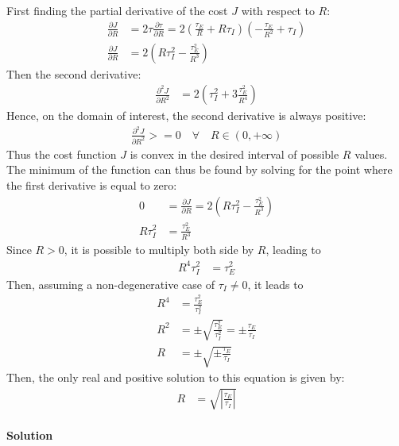 First finding the partial derivative of the cost $J$ with respect to $R$:
%
\begin{align}
\frac{ \partial J }{ \partial R  } &=  2 \tau \frac{ \partial \tau }{ \partial R } = 2 \left( \frac{\tau_E}{R} + R \tau_I \right) \left( -\frac{\tau_E}{R^2} + \tau_I \right) \\
\frac{ \partial J }{ \partial R  } &= 2 \left( R \tau_I^2 - \frac{\tau_E^2}{R^3} \right)
\end{align}
%
Then the second derivative:
%
\begin{align}
\frac{ \partial^2 J }{ \partial R^2  } &= 2 \left( \tau_I^2 + 3 \frac{\tau_E^2}{R^4} \right)
\end{align}
%
Hence, on the domain of interest, the second derivative is always positive:
%
\begin{align}
\frac{ \partial^2 J }{ \partial R^2  } >= 0  \quad \forall \quad R \in (0,+\infty)
\end{align}
%
Thus the cost function $J$ is convex in the desired interval of possible $R$ values. The minimum of the function can thus be found by solving for the point where the first derivative is equal to zero:
%
\begin{align}
0 &= \frac{ \partial J }{ \partial R  } = 2 \left( R \tau_I^2 - \frac{\tau_E^2}{R^3} \right) \\
R \tau_I^2 &= \frac{\tau_E^2}{R^3} 
\end{align}
%
Since $R>0$, it is possible to multiply both side by $R$, leading to
%
\begin{align}
R^4 \tau_I^2 &= \tau_E^2
\end{align}
%
Then, assuming a non-degenerative case of $\tau_I \neq 0$, it leads to
%
\begin{align}
R^4  &= \frac{\tau_E^2}{\tau_I^2} \\
R^2  &= \pm \sqrt{ \frac{\tau_E^2}{\tau_I^2} } = \pm \frac{\tau_E}{\tau_I} \\
R    &= \pm \sqrt{ \pm \frac{\tau_E}{\tau_I} } 
\end{align}
%
Then, the only real and positive solution to this equation is given by:
%
\begin{align}
R    &= \sqrt{ \left| \frac{\tau_E}{\tau_I} \right|} 
\end{align}
%

\paragraph{Solution}

